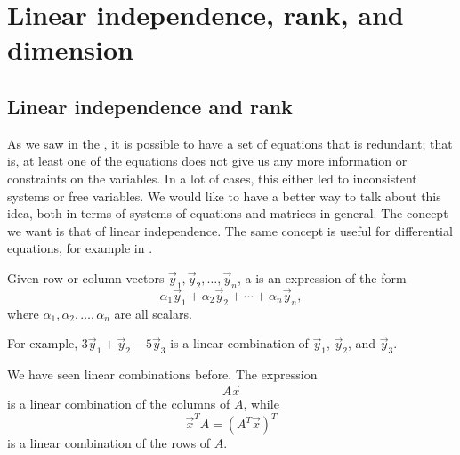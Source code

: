 
\section{Linear independence, rank, and dimension}
\label{subspaces:section}



\subsection{Linear independence and rank}

As we saw in the , it is possible to have a set of equations that is redundant; that is, at least one of the equations does not give us any more information or constraints on the variables. In a lot of cases, this either led to inconsistent systems or free variables. We would like to have a better way to talk about this idea, both in terms of systems of equations and matrices in general. The concept we want is that of linear independence.
The same concept is useful for differential equations, for
example in .

\begin{definition}
Given row or column vectors $\vec{y}_1, \vec{y}_2, \ldots, \vec{y}_n$,
a \emph{} is an expression of the form
\begin{equation*}
\alpha_1 \vec{y}_1 + 
\alpha_2 \vec{y}_2 + 
\cdots +
\alpha_n \vec{y}_n ,
\end{equation*}
where $\alpha_1, \alpha_2, \ldots, \alpha_n$ are all scalars.
\end{definition}%
For example,
$3 \vec{y}_1 + \vec{y}_2 - 5 \vec{y}_3$ is a linear combination
of $\vec{y}_1$, $\vec{y}_2$, and $\vec{y}_3$.

We have seen linear combinations before.  The expression
\begin{equation*}
A \vec{x}
\end{equation*}
is a linear combination of the columns of $A$, while
\begin{equation*}
\vec{x}^T A = (A^T \vec{x})^T
\end{equation*}
is a linear combination of the rows of $A$.

